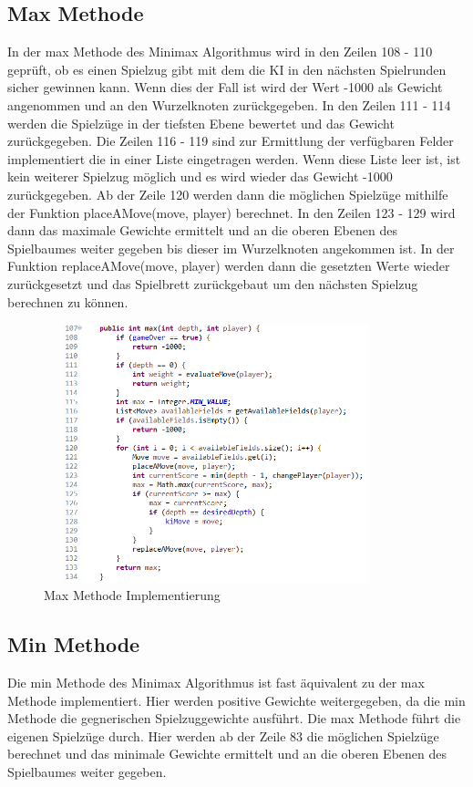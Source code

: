 \documentclass[oneside]{ausarbeitung}
\begin{document}
\subsection{Max Methode}

In der max Methode des Minimax Algorithmus wird in den Zeilen 108 - 110 geprüft, ob es einen Spielzug gibt mit dem die KI in den nächsten Spielrunden sicher gewinnen kann. Wenn dies der Fall ist wird der Wert -1000 als Gewicht angenommen und an den Wurzelknoten zurückgegeben. In den Zeilen 111 - 114 werden die Spielzüge in der tiefsten Ebene bewertet und das Gewicht zurückgegeben. Die Zeilen 116 - 119 sind zur Ermittlung der verfügbaren Felder implementiert die in einer Liste eingetragen werden. Wenn diese Liste leer ist, ist kein weiterer Spielzug möglich und es wird wieder das Gewicht -1000 zurückgegeben. Ab der Zeile 120 werden dann die möglichen Spielzüge mithilfe der Funktion placeAMove(move, player) berechnet. In den Zeilen 123 - 129 wird dann das maximale Gewichte ermittelt und an die oberen Ebenen des Spielbaumes weiter gegeben bis dieser im Wurzelknoten angekommen ist. In der Funktion replaceAMove(move, player) werden dann die gesetzten Werte wieder zurückgesetzt und das Spielbrett zurückgebaut um den nächsten Spielzug berechnen zu können. 

\begin{figure}[ht]
	\centering
	\includegraphics[width=10cm,height=7.5cm]{images/maxMethode.png}
	\caption[Max Methode Implementierung]{Max Methode Implementierung}
\end{figure}

\subsection{Min Methode}

Die min Methode des Minimax Algorithmus ist fast äquivalent zu der max Methode implementiert. Hier werden positive Gewichte weitergegeben, da die min Methode die gegnerischen Spielzuggewichte ausführt. Die max Methode führt die eigenen Spielzüge durch. Hier werden ab der Zeile 83 die möglichen Spielzüge berechnet und das minimale Gewichte ermittelt und an die oberen Ebenen des Spielbaumes weiter gegeben.
\end{document}
